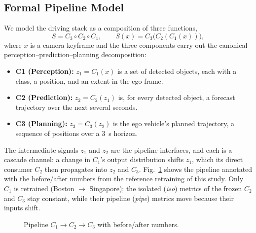 \documentclass[conference]{IEEEtran}
\begin{document}
\subsection{Formal Pipeline Model}
We model the driving stack as a composition of three functions,
\begin{equation}
S = C_3 \circ C_2 \circ C_1,
\qquad
S(x) = C_3\bigl(C_2(C_1(x))\bigr),
\label{eq:comp}
\end{equation}
where $x$ is a camera keyframe and the three components carry out the
canonical perception--prediction--planning decomposition:
\begin{itemize}
\item \textbf{C1 (Perception):} $z_1 = C_1(x)$ is a set of detected objects,
each with a class, a position, and an extent in the ego frame.
\item \textbf{C2 (Prediction):} $z_2 = C_2(z_1)$ is, for every detected
object, a forecast trajectory over the next several seconds.
\item \textbf{C3 (Planning):} $z_3 = C_3(z_2)$ is the ego vehicle's planned
trajectory, a sequence of positions over a $3$~s horizon.
\end{itemize}
The intermediate signals $z_1$ and $z_2$ are the pipeline interfaces, and each
is a cascade channel: a change in $C_1$'s output distribution shifts $z_1$,
which its direct consumer $C_2$ then propagates into $z_2$ and $C_3$.
Fig.~\ref{fig:pipeline} shows the pipeline annotated with the before/after
numbers from the reference retraining of this study. Only $C_1$ is retrained
(Boston $\to$ Singapore); the isolated (\emph{iso}) metrics of the frozen $C_2$
and $C_3$ stay constant, while their pipeline (\emph{pipe}) metrics move because
their inputs shift.

\begin{figure}[htbp]
\centering
{}
\caption{Pipeline $C_1\!\to\!C_2\!\to\!C_3$ with before/after numbers.}
\label{fig:pipeline}
\end{figure}
\end{document}

